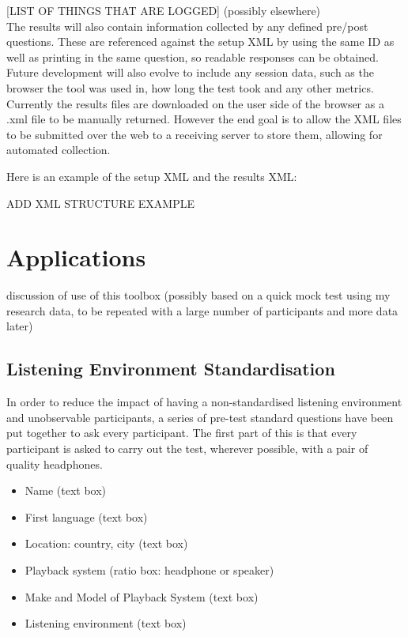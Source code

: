 \documentclass{article}
\begin{document}
[LIST OF THINGS THAT ARE LOGGED] (possibly elsewhere)\\

The results will also contain information collected by any defined pre/post questions. These are referenced against the setup XML by using the same ID as well as printing in the same question, so readable responses can be obtained. Future development will also evolve to include any session data, such as the browser the tool was used in, how long the test took and any other metrics. Currently the results files are downloaded on the user side of the browser as a .xml file to be manually returned. However the end goal is to allow the XML files to be submitted over the web to a receiving server to store them, allowing for automated collection.

Here is an example of the setup XML and the results XML:

ADD XML STRUCTURE EXAMPLE

\section{Applications}\label{sec:applications} %
discussion of use of this toolbox (possibly based on a quick mock test using my research data, to be repeated with a large number of participants and more data later)\\

\subsection{Listening Environment Standardisation}

In order to reduce the impact of having a non-standardised listening environment and unobservable participants, a series of pre-test standard questions have been put together to ask every participant. The first part of this is that every participant is asked to carry out the test, wherever possible, with a pair of quality headphones.

\begin{itemize}
\item Name (text box)
\item First language (text box)
\item Location: country, city (text box)
\item Playback system (ratio box: headphone or speaker)
\item Make and Model of Playback System (text box)
\item Listening environment (text box)
\end{itemize}
\end{document}
